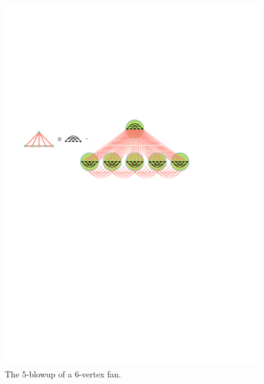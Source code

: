 \documentclass{patmorin}
\begin{document}
\begin{figure}[ht]
   \centering
   \includegraphics{figs/fan-blowup}
    \caption{The $5$-blowup of a $6$-vertex fan.}
    \label{5blowup}
\end{figure}
\end{document}
